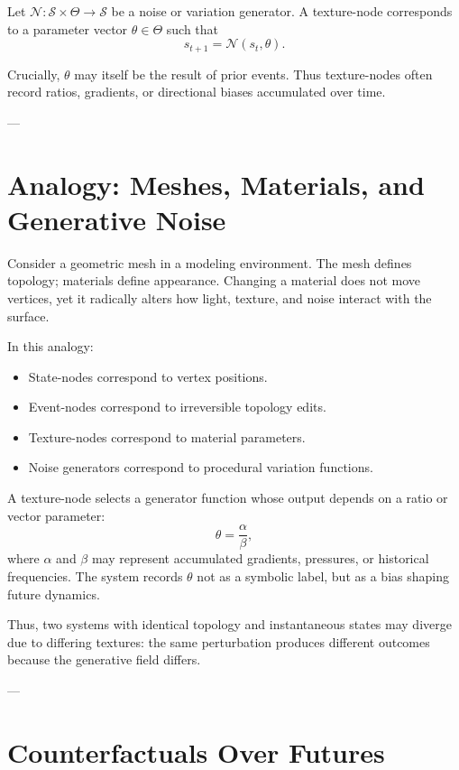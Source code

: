 \documentclass[11pt]{article}
\newcommand{\State}{\mathcal{S}}
\newcommand{\Noise}{\mathcal{N}}
\begin{document}
Let $\Noise : \State \times \Theta \to \State$ be a noise or variation generator. A texture-node corresponds to a parameter vector $\theta \in \Theta$ such that
\[
s_{t+1} = \Noise(s_t, \theta).
\]

Crucially, $\theta$ may itself be the result of prior events. Thus texture-nodes often record ratios, gradients, or directional biases accumulated over time.

---

\section{Analogy: Meshes, Materials, and Generative Noise}

Consider a geometric mesh in a modeling environment. The mesh defines topology; materials define appearance. Changing a material does not move vertices, yet it radically alters how light, texture, and noise interact with the surface.

In this analogy:
\begin{itemize}
\item State-nodes correspond to vertex positions.
\item Event-nodes correspond to irreversible topology edits.
\item Texture-nodes correspond to material parameters.
\item Noise generators correspond to procedural variation functions.
\end{itemize}

A texture-node selects a generator function whose output depends on a ratio or vector parameter:
\[
\theta = \frac{\alpha}{\beta},
\]
where $\alpha$ and $\beta$ may represent accumulated gradients, pressures, or historical frequencies. The system records $\theta$ not as a symbolic label, but as a bias shaping future dynamics.

Thus, two systems with identical topology and instantaneous states may diverge due to differing textures: the same perturbation produces different outcomes because the generative field differs.

---

\section{Counterfactuals Over Futures}
\end{document}
